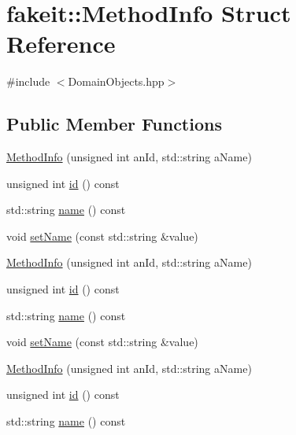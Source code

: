 \hypertarget{structfakeit_1_1MethodInfo}{}\section{fakeit\+::Method\+Info Struct Reference}
\label{structfakeit_1_1MethodInfo}


{\ttfamily \#include $<$Domain\+Objects.\+hpp$>$}

\subsection*{Public Member Functions}
\begin{DoxyCompactItemize}
\item 
\mbox{\hyperlink{structfakeit_1_1MethodInfo_a55bde4b21f0b316f2f01d7e76cee5890}{Method\+Info}} (unsigned int an\+Id, std\+::string a\+Name)
\item 
unsigned int \mbox{\hyperlink{structfakeit_1_1MethodInfo_a013ce0b5f78a9ca29bfb383d49cefb2a}{id}} () const
\item 
std\+::string \mbox{\hyperlink{structfakeit_1_1MethodInfo_ab27987f3bbd7fee8e4762323b333cb27}{name}} () const
\item 
void \mbox{\hyperlink{structfakeit_1_1MethodInfo_a77e8fe8e88ba1c84dfa8d45d74b5e854}{set\+Name}} (const std\+::string \&value)
\item 
\mbox{\hyperlink{structfakeit_1_1MethodInfo_a55bde4b21f0b316f2f01d7e76cee5890}{Method\+Info}} (unsigned int an\+Id, std\+::string a\+Name)
\item 
unsigned int \mbox{\hyperlink{structfakeit_1_1MethodInfo_a013ce0b5f78a9ca29bfb383d49cefb2a}{id}} () const
\item 
std\+::string \mbox{\hyperlink{structfakeit_1_1MethodInfo_ab27987f3bbd7fee8e4762323b333cb27}{name}} () const
\item 
void \mbox{\hyperlink{structfakeit_1_1MethodInfo_a77e8fe8e88ba1c84dfa8d45d74b5e854}{set\+Name}} (const std\+::string \&value)
\item 
\mbox{\hyperlink{structfakeit_1_1MethodInfo_a55bde4b21f0b316f2f01d7e76cee5890}{Method\+Info}} (unsigned int an\+Id, std\+::string a\+Name)
\item 
unsigned int \mbox{\hyperlink{structfakeit_1_1MethodInfo_a013ce0b5f78a9ca29bfb383d49cefb2a}{id}} () const
\item 
std\+::string \mbox{\hyperlink{structfakeit_1_1MethodInfo_ab27987f3bbd7fee8e4762323b333cb27}{name}} () const
\item 

\end{DoxyCompactItemize}
